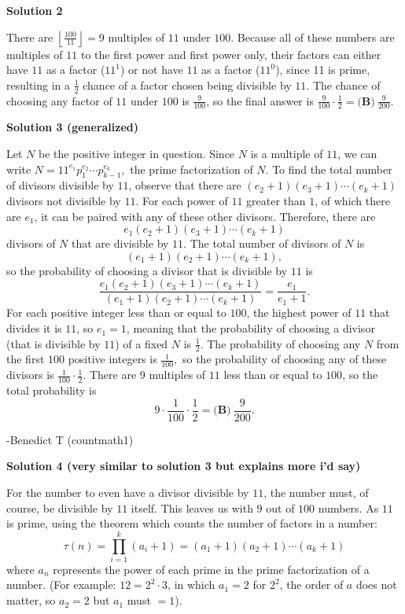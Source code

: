 \begin{enumerate}
\textbf{Solution 2}

There are $\left\lfloor\frac{100}{11}\right\rfloor = 9$ multiples of $11$ under $100$. Because all of these numbers are multiples of $11$ to the first power and first power only, their factors can either have $11$ as a factor ($11^{1}$) or not have $11$ as a factor ($11^{0}$), since 11 is prime, resulting in a $\frac{1}{2}$ chance of a factor chosen being divisible by $11$. The chance of choosing any factor of $11$ under $100$ is $\frac{9}{100}$, so the final answer is $\frac{9}{100} \cdot \frac{1}{2} = \boxed{\textbf{(B)}~\frac{9}{200}}.$




\textbf{Solution 3 (generalized)}

Let $N$ be the positive integer in question. Since $N$ is a multiple of $11$, we can write $N = 11^{e_1}p_1^{e_2}\cdots p_{k-1}^{e_k},$ the prime factorization of $N$. To find the total number of divisors divisible by $11$, observe that there are $(e_2 + 1)(e_3 + 1)\cdots (e_k  + 1)$ divisors not divisible by $11$. For each power of $11$ greater than $1$, of which there are $e_1$, it can be paired with any of these other divisors. Therefore, there are 
 \[e_1(e_2+1)(e_3 + 1)\cdots (e_k + 1)\]divisors of $N$ that are divisible by $11$. The total number of divisors of $N$ is 
 \[(e_1 + 1)(e_2 + 1)\cdots (e_k + 1),\] so the probability of choosing a divisor that is divisible by $11$ is 
 \[\frac{e_1(e_2+1)(e_3 + 1)\cdots (e_k + 1)}{(e_1 + 1)(e_2 + 1)\cdots (e_k + 1)} = \frac{e_1}{e_1 + 1}.\]For each positive integer less than or equal to $100$, the highest power of $11$ that divides it is $11$, so $e_1 = 1$, meaning that the probability of choosing a divisor (that is divisible by $11$) of a fixed $N$ is $\frac{1}{2}.$ The probability of choosing any $N$ from the first $100$ positive integers is $\frac{1}{100},$ so the probability of choosing any of these divisors is $\frac{1}{100}\cdot \frac{1}{2}.$ There are $9$ multiples of $11$ less than or equal to $100$, so the total probability is
 \[9\cdot \frac{1}{100}\cdot \frac{1}{2} = \boxed{\textbf{(B)}\ \frac{9}{200}}.\]

 -Benedict T (countmath1)

 



\textbf{Solution 4 (very similar to solution 3 but explains more i'd say)}

For the number to even have a divisor divisible by $11$, the number must, of course, be divisible by $11$ itself. This leaves us with $9$ out of $100$ numbers. As $11$ is prime, using the theorem which counts the number of factors in a number:
 \[\tau(n) = \prod_{i=1}^k (a_i + 1) = (a_1 + 1)(a_2 + 1)\cdots(a_k + 1)\]where $a_n$ represents the power of each prime in the prime factorization of a number. (For example: $12 = 2^{2} \cdot 3$, in which $a_1 = 2$ for $2^{2}$, the order of $a$ does not matter, so $a_2 = 2$ but $a_1$ must $= 1$). 


\end{enumerate}
